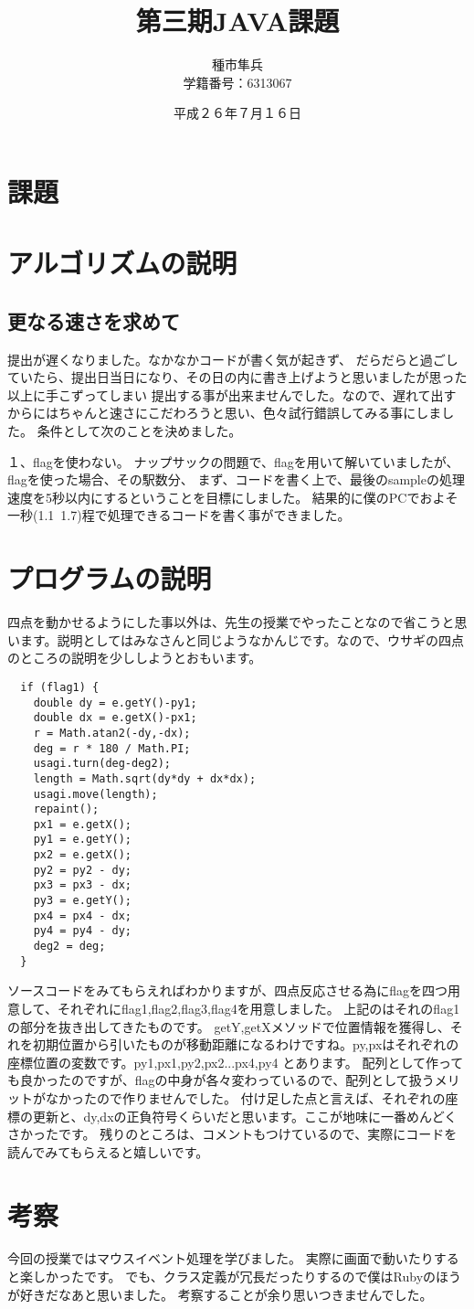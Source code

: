 \documentclass[titlepage]{jarticle}
\title{第三期JAVA課題}
\author{種市隼兵\\学籍番号：6313067}
\date{平成２６年７月１６日}
\begin{document}
\maketitle

\section{課題}

\section{アルゴリズムの説明}
\subsection{更なる速さを求めて}
提出が遅くなりました。なかなかコードが書く気が起きず、
だらだらと過ごしていたら、提出日当日になり、その日の内に書き上げようと思いましたが思った以上に手こずってしまい
提出する事が出来ませんでした。なので、遅れて出すからにはちゃんと速さにこだわろうと思い、色々試行錯誤してみる事にしました。
条件として次のことを決めました。

１、flagを使わない。
ナップサックの問題で、flagを用いて解いていましたが、
flagを使った場合、その駅数分、
まず、コードを書く上で、最後のsampleの処理速度を5秒以内にするということを目標にしました。
結果的に僕のPCでおよそ一秒(1.1~1.7)程で処理できるコードを書く事ができました。


\section{プログラムの説明}
四点を動かせるようにした事以外は、先生の授業でやったことなので省こうと思います。説明としてはみなさんと同じようなかんじです。なので、ウサギの四点のところの説明を少ししようとおもいます。
\begin{verbatim}
  if (flag1) {
    double dy = e.getY()-py1;
    double dx = e.getX()-px1;
    r = Math.atan2(-dy,-dx);
    deg = r * 180 / Math.PI;
    usagi.turn(deg-deg2);
    length = Math.sqrt(dy*dy + dx*dx);
    usagi.move(length);
    repaint();
    px1 = e.getX();
    py1 = e.getY();
    px2 = e.getX();
    py2 = py2 - dy;
    px3 = px3 - dx;
    py3 = e.getY();
    px4 = px4 - dx;
    py4 = py4 - dy;
    deg2 = deg;
  }
\end{verbatim}
ソースコードをみてもらえればわかりますが、四点反応させる為にflagを四つ用意して、それぞれにflag1,flag2,flag3,flag4を用意しました。
上記のはそれのflag1の部分を抜き出してきたものです。
getY,getXメソッドで位置情報を獲得し、それを初期位置から引いたものが移動距離になるわけですね。py,pxはそれぞれの座標位置の変数です。py1,px1,py2,px2...px4,py4
とあります。
配列として作っても良かったのですが、flagの中身が各々変わっているので、配列として扱うメリットがなかったので作りませんでした。
付け足した点と言えば、それぞれの座標の更新と、dy,dxの正負符号くらいだと思います。ここが地味に一番めんどくさかったです。
残りのところは、コメントもつけているので、実際にコードを読んでみてもらえると嬉しいです。

\section{考察}
今回の授業ではマウスイベント処理を学びました。
実際に画面で動いたりすると楽しかったです。
でも、クラス定義が冗長だったりするので僕はRubyのほうが好きだなあと思いました。
考察することが余り思いつきませんでした。
\end{document}
